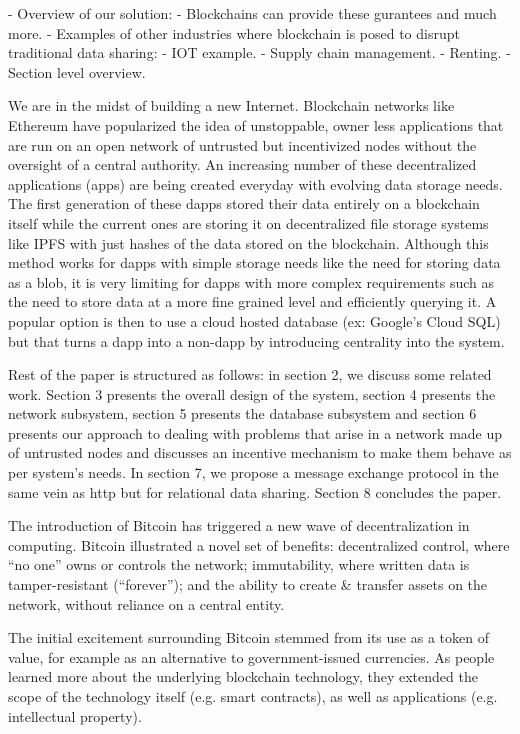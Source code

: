 - Overview of our solution:
  - Blockchains can provide these gurantees and much more. 
  - Examples of other industries where blockchain is posed to disrupt traditional data sharing:
    - IOT example.
    - Supply chain management.
    - Renting.
  - Section level overview.



We are in the midst of building a new Internet. Blockchain networks like Ethereum have popularized the idea of
unstoppable, owner less applications that are run on an open network of untrusted but incentivized nodes without the
oversight of a central authority. An increasing number of these decentralized applications (\DJ apps) are being created
everyday with evolving data storage needs. The first generation of these dapps stored their data entirely on a
blockchain itself while the current ones are storing it on decentralized file storage systems like IPFS with just hashes
of the data stored on the blockchain. Although this method works for dapps with simple storage needs like the need for
storing data as a blob, it is very limiting for dapps with more complex requirements such as the need to store data at a
more fine grained level and efficiently querying it. A popular option is then to use a cloud hosted database (ex:
Google’s Cloud SQL) but that turns a dapp into a non-dapp by introducing centrality into the system. \newline\newline

Rest of the paper is structured as follows: in section 2, we discuss some related work. Section 3 presents the overall design of the system, section 4 presents the network subsystem, section 5 presents the database subsystem and section 6 presents our approach to dealing with problems that arise in a network made up of untrusted nodes and discusses an incentive mechanism to make them behave as per system's needs. In section 7, we propose a message exchange protocol in the same vein as http but for relational data sharing. Section 8 concludes the paper.


The introduction of Bitcoin \cite{nakamoto2009bitcoin} has triggered a new wave of decentralization in computing. 
Bitcoin illustrated a novel set of benefits: decentralized control, where ``no one'' owns or controls the network; immutability,
where written data is tamper-resistant (``forever''); and the ability to create \& transfer assets on the network, without reliance on a central entity.

The initial excitement surrounding Bitcoin stemmed from its use as a token of value, for example as an alternative to government-issued currencies.
As people learned more about the underlying blockchain technology, they extended the scope of the technology itself (e.g. smart contracts), as well as applications (e.g. intellectual property).

